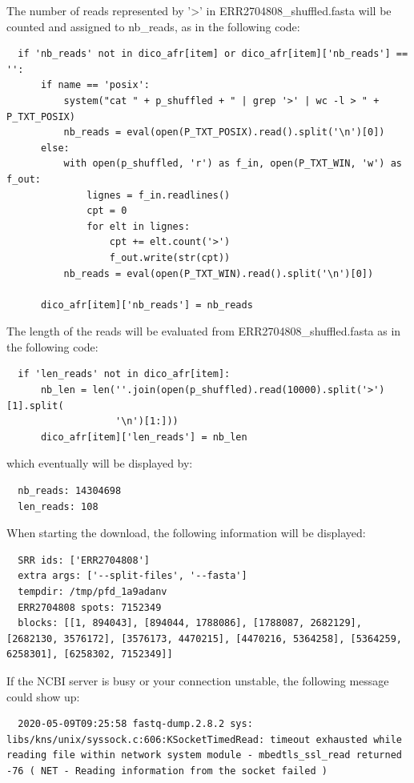\documentclass[twoside,a4paper,11pt,frenchb,openany]{report}
\begin{document}
    The number of reads represented by '\textgreater{}' in
ERR2704808\_shuffled.fasta will be counted and assigned to nb\_reads, as
in the following code:

\begin{verbatim}
  if 'nb_reads' not in dico_afr[item] or dico_afr[item]['nb_reads'] == '':
      if name == 'posix':
          system("cat " + p_shuffled + " | grep '>' | wc -l > " + P_TXT_POSIX)
          nb_reads = eval(open(P_TXT_POSIX).read().split('\n')[0])
      else:
          with open(p_shuffled, 'r') as f_in, open(P_TXT_WIN, 'w') as f_out:
              lignes = f_in.readlines()
              cpt = 0
              for elt in lignes:
                  cpt += elt.count('>')
                  f_out.write(str(cpt))
          nb_reads = eval(open(P_TXT_WIN).read().split('\n')[0])

      dico_afr[item]['nb_reads'] = nb_reads
\end{verbatim}

    The length of the reads will be evaluated from
ERR2704808\_shuffled.fasta as in the following code:

\begin{verbatim}
  if 'len_reads' not in dico_afr[item]:
      nb_len = len(''.join(open(p_shuffled).read(10000).split('>')[1].split(
                   '\n')[1:]))
      dico_afr[item]['len_reads'] = nb_len
\end{verbatim}

    which eventually will be displayed by:

    \begin{verbatim}
  nb_reads: 14304698
  len_reads: 108
\end{verbatim}

    When starting the download, the following information will be displayed:

    \begin{verbatim}
  SRR ids: ['ERR2704808']
  extra args: ['--split-files', '--fasta']
  tempdir: /tmp/pfd_1a9adanv
  ERR2704808 spots: 7152349
  blocks: [[1, 894043], [894044, 1788086], [1788087, 2682129], [2682130, 3576172], [3576173, 4470215], [4470216, 5364258], [5364259, 6258301], [6258302, 7152349]]
\end{verbatim}

    If the NCBI server is busy or your connection unstable, the following
message could show up:

    \begin{verbatim}
  2020-05-09T09:25:58 fastq-dump.2.8.2 sys: libs/kns/unix/syssock.c:606:KSocketTimedRead: timeout exhausted while reading file within network system module - mbedtls_ssl_read returned -76 ( NET - Reading information from the socket failed )
\end{verbatim}
\end{document}
